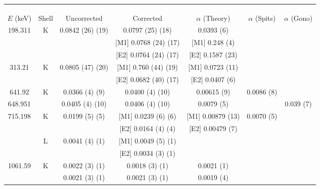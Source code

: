 \begin{landscape}
\begin{table}
    \centering
\begin{ThreePartTable}
\centering
    \begin{tabular}{>{\footnotesize}c|>{\footnotesize}c|>{\footnotesize}c|>{\footnotesize}c|>{\footnotesize}c|>{\footnotesize}c|>{\footnotesize}c}
        \multicolumn{7}{>{\fontsize{12}{15}}c}{TABLE 4.4 (CONTINUED)}\\
        \multicolumn{7}{>{\fontsize{12}{15}}c}{(b)}\\
        \toprule
        &  & \multicolumn{2}{>{\footnotesize}c|}{$\alpha$ (This Work)} & & \\
        $E$ (keV)	& Shell	&	Uncorrected & Corrected &	$\alpha$  (Theory)\citep{kibedi08:_BRICC}	&	$\alpha$ (Spits)\citep{spits96:_154gd} & 	$\alpha$ (Gono)\citep{gono74:_154gd_e0}\\
	    \hline
        198.311	& K &	0.0842	(26) (19)	& 0.0797 (25) (18) & 	0.0393 (6)	&		\\
        &	 & 			&	[M1] 0.0768 (24) (17)	& [M1] 0.248 (4) &\\
        &	&	&		[E2] 0.0764 (24) (17)	& [E2] 0.1587 (23) & \\
	    \hline
        313.21	&	 K	&	0.0805	(47) (20)	 & [M1] 0.760 (44) (19) &	[M1] 0.0723 (11)	&		\\
        	&	&	&	[E2] 0.0682 (40) (17) &	[E2] 0.0407 (6)	&		\\
        \hline
        641.92	& K &	0.0366 (4) (9)	&	0.0400 (4) (10)	 & 0.00615 (9)  &	0.0086 (8)	\\
        648.951	&		&	0.0405 (4) (10)	&	0.0406 (4) (10) & 0.0079 (5) &  & 0.039 (7)	\\
        \hline
        715.198	& K &	0.0199	(5) (5)	& [M1] 0.0239 (6) (6)	& [M1] 0.00879 (13) 	&	0.0070 (5)	\\
        &				  &	& [E2] 0.0164 (4) (4)	& [E2] 0.00479 (7)		& \\
        &				 L &	0.0041	(4) (1)	&	[M1] 0.0049 (5) (1)	& & 		\\
        &				&				  	&	[E2] 0.0034 (3) (1)	& & 		\\
	    \hline
        1061.59	& K &	0.0022	(3) (1)	&	0.0018 (3) (1) & 0.0021 (1)	&		\\
	    &				&	0.0021 (3) (1) & 0.0021 (3) (1) & 0.0019 (4) &	\\
        \bottomrule
    \end{tabular}

\end{ThreePartTable}
\end{table}
\end{landscape}
